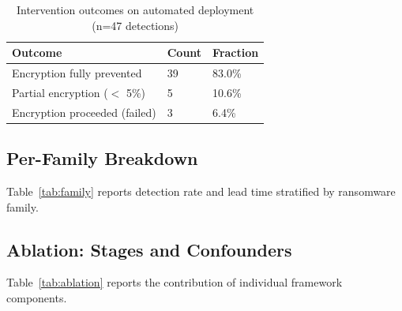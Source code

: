 \documentclass[sigconf,nonacm]{acmart}
\begin{document}
\begin{table}[h]
\caption{Intervention outcomes on automated deployment (n=47 detections)}
\label{tab:intervention}
\small
\begin{tabularx}{\columnwidth}{@{}p{2.6cm}X X@{}}
\toprule
\textbf{Outcome} & \textbf{Count} & \textbf{Fraction} \\
\midrule
Encryption fully prevented   & 39 & 83.0\% \\
Partial encryption ($<$ 5\%) & 5  & 10.6\% \\
Encryption proceeded (failed) & 3 & 6.4\% \\
\bottomrule
\end{tabularx}
\end{table}

\subsection{Per-Family Breakdown}

Table~\ref{tab:family} reports detection rate and lead time stratified
by ransomware family.

\begin{table}[h]
\caption{Detection by ransomware family}
\label{tab:family}
\end{table}

\subsection{Ablation: Stages and Confounders}

Table~\ref{tab:ablation} reports the contribution of individual
framework components.
\end{document}
